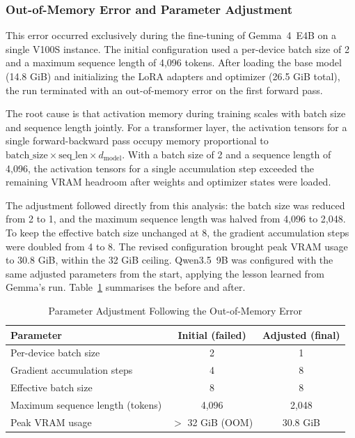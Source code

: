\subsubsection{Out-of-Memory Error and Parameter Adjustment}

This error occurred exclusively during the fine-tuning of Gemma~4~E4B on a single V100S instance. The initial configuration used a per-device batch size of 2 and a maximum sequence length of 4,096 tokens. After loading the base model (14.8 GiB) and initializing the LoRA adapters and optimizer (26.5 GiB total), the run terminated with an out-of-memory error on the first forward pass.

\vspace{1em}

The root cause is that activation memory during training scales with batch size and sequence length jointly. For a transformer layer, the activation tensors for a single forward-backward pass occupy memory proportional to $\text{batch\_size} \times \text{seq\_len} \times d_{\text{model}}$. With a batch size of 2 and a sequence length of 4,096, the activation tensors for a single accumulation step exceeded the remaining \ac{VRAM} headroom after weights and optimizer states were loaded.

\vspace{1em}

The adjustment followed directly from this analysis: the batch size was reduced from 2 to 1, and the maximum sequence length was halved from 4,096 to 2,048. To keep the effective batch size unchanged at 8, the gradient accumulation steps were doubled from 4 to 8. The revised configuration brought peak \ac{VRAM} usage to 30.8 GiB, within the 32 GiB ceiling. Qwen3.5~9B was configured with the same adjusted parameters from the start, applying the lesson learned from Gemma's run. Table~\ref{tab:oom-adjustment} summarises the before and after.

\begin{table}[H]
\centering
\caption{Parameter Adjustment Following the Out-of-Memory Error}
\label{tab:oom-adjustment}
\renewcommand{\arraystretch}{1.3}
\begin{tabular}{|p{5.5cm}|c|c|}
\hline
\textbf{Parameter} & \textbf{Initial (failed)} & \textbf{Adjusted (final)} \\
\hline
Per-device batch size & 2 & 1 \\
\hline
Gradient accumulation steps & 4 & 8 \\
\hline
Effective batch size & 8 & 8 \\
\hline
Maximum sequence length (tokens) & 4,096 & 2,048 \\
\hline
Peak \ac{VRAM} usage & $>$ 32 GiB (OOM) & 30.8 GiB \\
\hline
\end{tabular}
\end{table}

